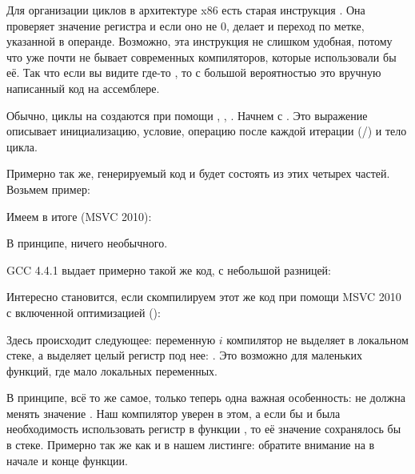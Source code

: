 
Для организации циклов в архитектуре x86 есть старая инструкция \LOOP. 
Она проверяет значение регистра \ECX и если оно не 0, делает  \ECX 
и переход по метке, указанной в операнде. 
Возможно, эта инструкция не слишком удобная, потому что уже почти не бывает современных компиляторов, 
которые использовали бы её. Так что если вы видите где-то \LOOP, то с большой вероятностью это 
вручную написанный код на ассемблере.

Обычно, циклы на \CCpp создаются при помощи , , .
Начнем с .
Это выражение описывает инициализацию, условие, операцию после каждой итерации
(/) и тело цикла.



Примерно так же, генерируемый код и будет состоять из этих четырех частей.
Возьмем пример:



Имеем в итоге (MSVC 2010):



В принципе, ничего необычного.

GCC 4.4.1 выдает примерно такой же код, с небольшой разницей:



Интересно становится, если скомпилируем этот же код при помощи MSVC 2010 с включенной оптимизацией (\TT{\Ox}):



Здесь происходит следующее: переменную $i$ компилятор не выделяет в локальном стеке, 
а выделяет целый регистр под нее: \ESI. 
Это возможно для маленьких функций, где мало локальных переменных.

В принципе, всё то же самое, только теперь одна важная особенность: 
\ttf не должна менять значение \ESI. 
Наш компилятор уверен в этом, а если бы и была необходимость использовать регистр \ESI в функции \ttf, 
то её значение сохранялось бы в стеке. Примерно так же как и в нашем листинге: 
обратите внимание на  в начале и конце функции.

